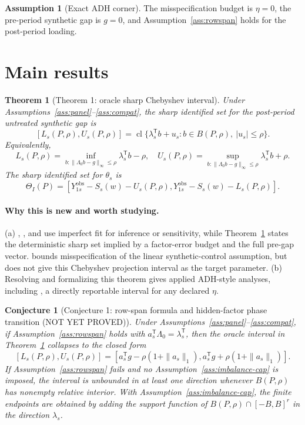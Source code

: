 \documentclass[11pt]{article}
\newcommand{\transpose}{\mathsf{T}}
\theoremstyle{definition}
\newtheorem{assumption}{Assumption}
\theoremstyle{plain}
\newtheorem{theorem}{Theorem}
\newtheorem{conjecture}{Conjecture}
\theoremstyle{remark}
\begin{document}
\begin{assumption}[Exact ADH corner]\label{ass:adh-corner}
The misspecification budget is \(\eta=0\), the pre-period synthetic gap is \(g=0\), and Assumption~\ref{ass:rowspan} holds for the post-period loading.
\end{assumption}

\section{Main results}
\begin{theorem}[Theorem 1: oracle sharp Chebyshev interval]\label{thm:oracle-sharp}
Under Assumptions~\ref{ass:panel}--\ref{ass:compat}, the sharp identified set for the post-period untreated synthetic gap is
\[
[L_s(P,\rho),U_s(P,\rho)]
=\operatorname{cl}\{\lambda_s^\transpose b+u_s:
b\in B(P,\rho),\ |u_s|\le\rho\}.
\]
Equivalently,
\[
L_s(P,\rho)=\inf_{b:\|\Lambda_0b-g\|_\infty\le\rho}\lambda_s^\transpose b-\rho,
\quad
U_s(P,\rho)=\sup_{b:\|\Lambda_0b-g\|_\infty\le\rho}\lambda_s^\transpose b+\rho.
\]
The sharp identified set for \(\theta_s\) is
\[
\Theta_I(P)=
[Y^{\mathrm{obs}}_{1s}-S_s(w)-U_s(P,\rho),
Y^{\mathrm{obs}}_{1s}-S_s(w)-L_s(P,\rho)].
\]
\end{theorem}

\paragraph{Why this is new and worth studying.}
(a) \citet{FermanPinto2021}, \citet{FirpoPossebom2018}, and \citet{ChernozhukovWuthrichZhu2021} use imperfect fit for inference or sensitivity, while Theorem~\ref{thm:oracle-sharp} states the deterministic sharp set implied by a factor-error budget and the full pre-gap vector. \citet{NazaretShiBlei2024} bounds misspecification of the linear synthetic-control assumption, but does not give this Chebyshev projection interval as the target parameter. (b) Resolving and formalizing this theorem gives applied ADH-style analyses, including \citet{AbadieDiamondHainmueller2010}, a directly reportable interval for any declared \(\eta\).

\begin{conjecture}[Conjecture 1: row-span formula and hidden-factor phase transition (NOT YET PROVED)]\label{conj:row-span}
Under Assumptions~\ref{ass:panel}--\ref{ass:compat}, if Assumption~\ref{ass:rowspan} holds with \(a_s^\transpose\Lambda_0=\lambda_s^\transpose\), then the oracle interval in Theorem~\ref{thm:oracle-sharp} collapses to the closed form
\[
[L_s(P,\rho),U_s(P,\rho)]
=
[a_s^\transpose g-\rho(1+\|a_s\|_1),
a_s^\transpose g+\rho(1+\|a_s\|_1)].
\]
If Assumption~\ref{ass:rowspan} fails and no Assumption~\ref{ass:imbalance-cap} is imposed, the interval is unbounded in at least one direction whenever \(B(P,\rho)\) has nonempty relative interior. With Assumption~\ref{ass:imbalance-cap}, the finite endpoints are obtained by adding the support function of \(B(P,\rho)\cap[-B,B]^r\) in the direction \(\lambda_s\).
\end{conjecture}
\end{document}
